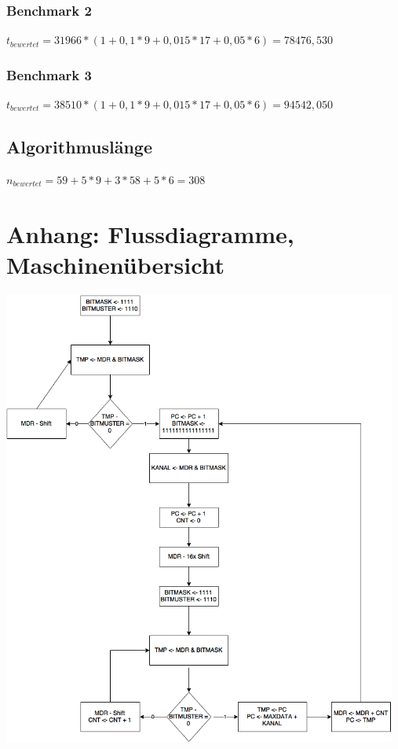 \documentclass[12pt,titlepage,german,a4]{article}
\begin{document}
    \subsubsection{Benchmark 2}
    $t_{bewertet} = 31966 * (1 + 0,1*9 + 0,015*17 + 0,05*6) = 78476,530$

    \subsubsection{Benchmark 3}
    $t_{bewertet} = 38510 * (1 + 0,1*9 + 0,015*17 + 0,05*6) = 94542,050$

    \subsection{Algorithmusl{\"a}nge}
    $n_{bewertet} = 59 + 5 * 9 + 3 * 58 + 5 * 6 = 308$


    \newpage

    \section{Anhang: Flussdiagramme, Maschinen{\"u}bersicht}
	\includegraphics[width=13cm]{img/algoComplete.png} \\
	\newpage
\end{document}

